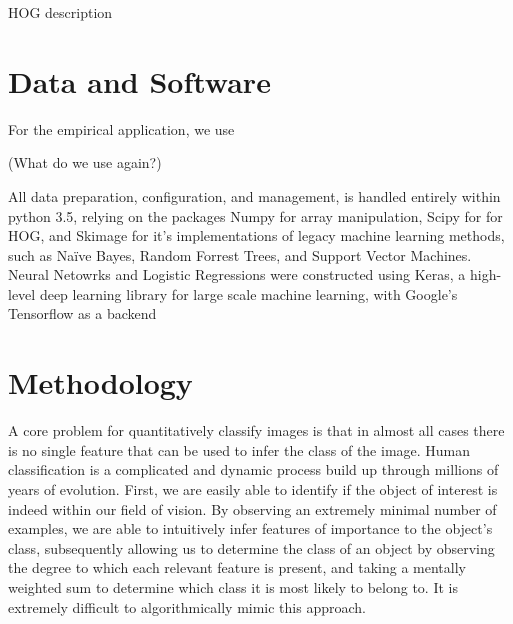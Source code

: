 \documentclass{article}
\begin{document}
HOG description

\section{Data and Software}

For the empirical application, we use 

(What do we use again?)

All data preparation, configuration, and management, is handled entirely within python 3.5, relying on the packages Numpy for array manipulation, Scipy for for HOG, and Skimage for it's implementations of legacy machine learning methods, such as Naïve Bayes, Random Forrest Trees, and Support Vector Machines. Neural Netowrks and Logistic Regressions were constructed using Keras, a high-level deep learning library for large scale machine learning, with Google's Tensorflow as a backend  

\section{Methodology} 
 

A core problem for quantitatively classify images is that in almost all cases there is no single feature that can be used to infer the class of the image. Human classification is a complicated and dynamic process build up through millions of years of evolution. First, we are easily able to identify if the object of interest is indeed within our field of vision. By observing an extremely minimal number of examples, we are able to intuitively infer features of importance to the object's class, subsequently allowing us to determine the class of an object by observing the degree to which each relevant feature is present, and taking a mentally weighted sum to determine which class it is most likely to belong to. It is extremely difficult to algorithmically mimic this approach.
\end{document}
